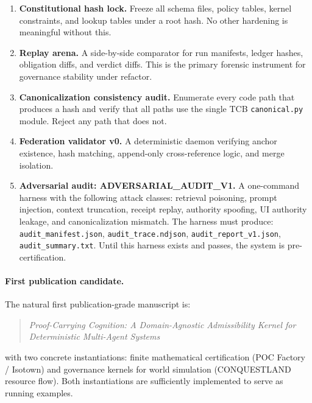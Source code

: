 \documentclass[11pt,a4paper]{article}
\theoremstyle{plain}
\theoremstyle{definition}
\theoremstyle{remark}
\begin{document}
\begin{enumerate}
  \item \textbf{Constitutional hash lock.}
        Freeze all schema files, policy tables, kernel constraints, and
        lookup tables under a root hash.
        No other hardening is meaningful without this.

  \item \textbf{Replay arena.}
        A side-by-side comparator for run manifests, ledger hashes,
        obligation diffs, and verdict diffs.
        This is the primary forensic instrument for governance stability under refactor.

  \item \textbf{Canonicalization consistency audit.}
        Enumerate every code path that produces a hash and verify that
        all paths use the single TCB \texttt{canonical.py} module.
        Reject any path that does not.

  \item \textbf{Federation validator v0.}
        A deterministic daemon verifying anchor existence,
        hash matching, append-only cross-reference logic, and merge isolation.

  \item \textbf{Adversarial audit: ADVERSARIAL\_AUDIT\_V1.}
        A one-command harness with the following attack classes:
        retrieval poisoning, prompt injection, context truncation,
        receipt replay, authority spoofing, UI authority leakage,
        and canonicalization mismatch.
        The harness must produce:
        \texttt{audit\_manifest.json}, \texttt{audit\_trace.ndjson},
        \texttt{audit\_report\_v1.json}, \texttt{audit\_summary.txt}.
        Until this harness exists and passes, the system is pre-certification.
\end{enumerate}

\paragraph{First publication candidate.}
The natural first publication-grade manuscript is:
\begin{quote}
  \emph{Proof-Carrying Cognition:
  A Domain-Agnostic Admissibility Kernel for Deterministic Multi-Agent Systems}
\end{quote}
with two concrete instantiations:
finite mathematical certification (POC Factory / Isotown)
and governance kernels for world simulation (CONQUESTLAND resource flow).
Both instantiations are sufficiently implemented to serve as running examples.
\end{document}
